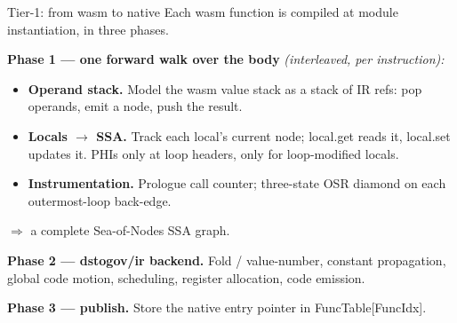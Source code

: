 \documentclass[aspectratio=169,11pt]{beamer}
\newcommand{\code}[1]{{\ttfamily\small #1}}
\begin{document}
\begin{frame}{Tier-1: from wasm to native}
  \small
  Each wasm function is compiled at module instantiation, in three phases.

  \vspace{0.3em}
  \textbf{Phase 1 --- one forward walk over the body} \emph{(interleaved, per instruction):}
  \begin{itemize}\setlength{\itemsep}{2pt}
    \item \textbf{Operand stack.} Model the wasm value stack as a stack of IR refs: pop operands, emit a node, push the result.
    \item \textbf{Locals $\to$ SSA.} Track each local's current node; \code{local.get} reads it, \code{local.set} updates it. PHIs only at loop headers, only for loop-modified locals.
    \item \textbf{Instrumentation.} Prologue call counter; three-state OSR diamond on each outermost-loop back-edge.
  \end{itemize}
  \hfill$\Rightarrow$ a complete Sea-of-Nodes SSA graph.

  \vspace{0.4em}
  \textbf{Phase 2 --- \code{dstogov/ir} backend.} Fold / value-number, constant propagation, global code motion, scheduling, register allocation, code emission.

  \vspace{0.3em}
  \textbf{Phase 3 --- publish.} Store the native entry pointer in \code{FuncTable[FuncIdx]}.
\end{frame}

\end{document}
